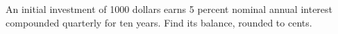 An initial investment of 1000 dollars earns 5 percent nominal annual interest compounded quarterly for ten years. Find its balance, rounded to cents.
